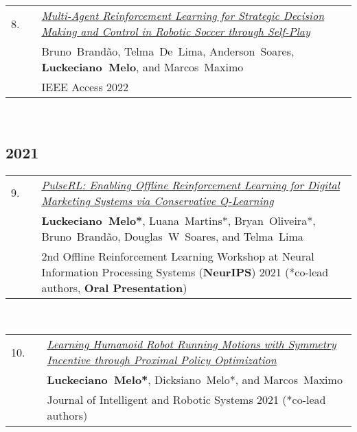 \documentclass[11pt,letter,sans,colorlinks,linkcolor=true]{moderncv}
\begin{document}
\begin{minipage}{\textwidth}
\begin{tabular}{R{8mm}p{1mm}L{6.5in}}
 8.\hspace*{1mm} && \textit{\href{https://ieeexplore.ieee.org/abstract/document/9817118}{Multi-Agent Reinforcement Learning for Strategic Decision Making and Control in Robotic Soccer through Self-Play} }  \\
 && \mbox{Bruno Brand{\~a}o}, \mbox{Telma De Lima}, \mbox{Anderson Soares}, \mbox{\textbf{Luckeciano Melo}}, and \mbox{Marcos Maximo} \\
 && IEEE Access 2022  \\
\end{tabular} \\[2mm]
\end{minipage}
\subsection{2021}

\begin{minipage}{\textwidth}
\begin{tabular}{R{8mm}p{1mm}L{6.5in}}
 9.\hspace*{1mm} && \textit{\href{https://offline-rl-neurips.github.io/2021/pdf/9.pdf}{PulseRL: Enabling Offline Reinforcement Learning for Digital Marketing Systems via Conservative Q-Learning} }  \\
 && \mbox{\textbf{Luckeciano Melo*}}, \mbox{Luana Martins*}, \mbox{Bryan Oliveira*}, \mbox{Bruno Brand{\~a}o}, \mbox{Douglas W Soares}, and \mbox{Telma Lima} \\
 && 2nd Offline Reinforcement Learning Workshop at Neural Information Processing Systems (\textbf{NeurIPS}) 2021 (*co-lead authors, \textbf{Oral Presentation}) \\
\end{tabular} \\[2mm]
\end{minipage}

\begin{minipage}{\textwidth}
\begin{tabular}{R{8mm}p{1mm}L{6.5in}}
 10.\hspace*{1mm} && \textit{\href{https://link.springer.com/article/10.1007/s10846-021-01355-9}{Learning Humanoid Robot Running Motions with Symmetry Incentive through Proximal Policy Optimization} }  \\
 && \mbox{\textbf{Luckeciano Melo*}}, \mbox{Dicksiano Melo*}, and \mbox{Marcos Maximo} \\
 && Journal of Intelligent and Robotic Systems 2021 (*co-lead authors) \\
\end{tabular} \\[2mm]
\end{minipage}
\end{document}
